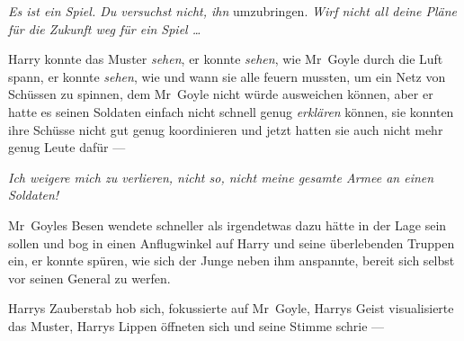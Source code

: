 \emph{Es ist ein Spiel. Du versuchst nicht, ihn} umzubringen. \emph{Wirf nicht all deine Pläne für die Zukunft weg für ein Spiel …}

Harry konnte das Muster \emph{sehen}, er konnte \emph{sehen}, wie Mr~Goyle durch die Luft spann, er konnte \emph{sehen}, wie und wann sie alle feuern mussten, um ein Netz von Schüssen zu spinnen, dem Mr~Goyle nicht würde ausweichen können, aber er hatte es seinen Soldaten einfach nicht schnell genug \emph{erklären} können, sie konnten ihre Schüsse nicht gut genug koordinieren und jetzt hatten sie auch nicht mehr genug Leute dafür —

\emph{Ich weigere mich zu verlieren, nicht so, nicht meine gesamte Armee an einen Soldaten!}

Mr~Goyles Besen wendete schneller als irgendetwas dazu hätte in der Lage sein sollen und bog in einen Anflugwinkel auf Harry und seine überlebenden Truppen ein, er konnte spüren, wie sich der Junge neben ihm anspannte, bereit sich selbst vor seinen General zu werfen.

\emph{}

Harrys Zauberstab hob sich, fokussierte auf Mr~Goyle, Harrys Geist visualisierte das Muster, Harrys Lippen öffneten sich und seine Stimme schrie —



